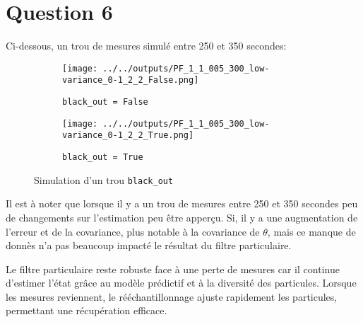 \documentclass[../CSC_5RO12_TA_TP3.tex]{subfiles}
\begin{document}
\section{Question 6}
\noindent Ci-dessous, un trou de mesures simulé entre 250 et 350 secondes:
\begin{figure}[H]
    \centering
    \begin{subfigure}[b]{0.475\textwidth}
        \centering
        \texttt{[image: ../../outputs/PF\_1\_1\_005\_300\_low-variance\_0-1\_2\_2\_False.png]}
        \caption{\texttt{black\_out = False}}
        \label{}
    \end{subfigure}\hfill
    \begin{subfigure}[b]{0.475\textwidth}
        \centering
        \texttt{[image: ../../outputs/PF\_1\_1\_005\_300\_low-variance\_0-1\_2\_2\_True.png]}
        \caption{\texttt{black\_out = True}}
        \label{}
    \end{subfigure}
    \caption{Simulation d'un trou \texttt{black\_out}}
    \label{}
\end{figure}
\noindent Il est à noter que lorsque il y a un trou de mesures entre 250 et 350 secondes peu de changements sur l'estimation peu être apperçu. Si, il y a une augmentation de l'erreur et de la covariance, plus notable à la covariance de $\theta$, mais ce manque de donnès n'a pas beaucoup impacté le résultat du filtre particulaire.\\

\begin{remark}
    Le filtre particulaire reste robuste face à une perte de mesures car il continue d'estimer l'état grâce au modèle prédictif et à la diversité des particules. Lorsque les mesures reviennent, le rééchantillonnage ajuste rapidement les particules, permettant une récupération efficace.
\end{remark}
\end{document}
